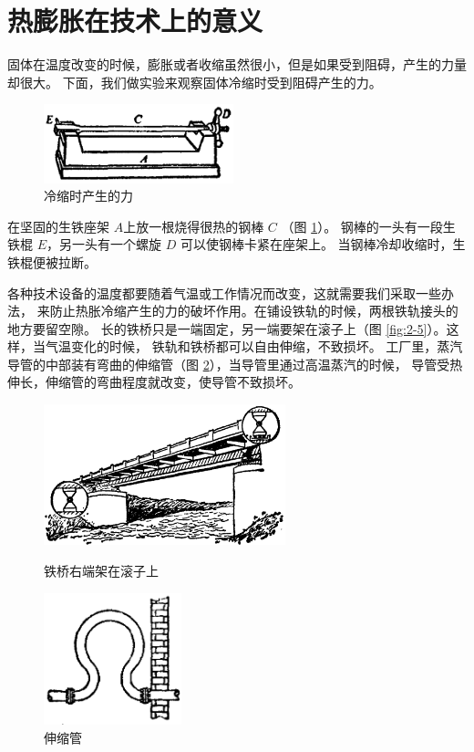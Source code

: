 \section{热膨胀在技术上的意义}\label{sec:2-2}

固体在温度改变的时候，膨胀或者收缩虽然很小，但是如果受到阻碍，产生的力量却很大。
下面，我们做实验来观察固体冷缩时受到阻碍产生的力。

\begin{figure}
    \centering
    \includegraphics[width=5.5cm]{../pic/czwl2-ch2-4}
    \caption{冷缩时产生的力}\label{fig:2-4}
\end{figure}

在坚固的生铁座架 $A$上放一根烧得很热的钢棒 $C$ （图 \ref{fig:2-4}）。
钢棒的一头有一段生铁棍 $E$，另一头有一个螺旋 $D$ 可以使钢棒卡紧在座架上。
当钢棒冷却收缩时，生铁棍便被拉断。

各种技术设备的温度都要随着气温或工作情况而改变，这就需要我们采取一些办法，
来防止热胀冷缩产生的力的破坏作用。在铺设铁轨的时候，两根铁轨接头的地方要留空隙。
长的铁桥只是一端固定，另一端要架在滚子上（图 \ref{fig:2-5}）。这样，当气温变化的时候，
铁轨和铁桥都可以自由伸缩，不致损坏。
工厂里，蒸汽导管的中部装有弯曲的伸缩管（图 \ref{fig:2-6}），当导管里通过高温蒸汽的时候，
导管受热伸长，伸缩管的弯曲程度就改变，使导管不致损坏。

\begin{figure}[htbp]
    \centering
    \begin{minipage}{9cm}
    \centering
    \includegraphics[width=7cm]{../pic/czwl2-ch2-5}
    \caption{铁桥右端架在滚子上}\label{fig:2-5}
    \end{minipage}
    \qquad
    \begin{minipage}{5cm}
    \centering
    \includegraphics[width=4cm]{../pic/czwl2-ch2-6}
    \caption{伸缩管}\label{fig:2-6}
    \end{minipage}
\end{figure}

